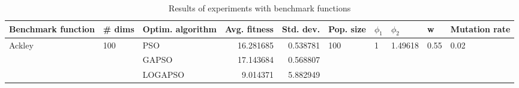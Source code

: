 \begin{table}
\centering
\caption{Results of experiments with benchmark functions}
\begin{tabular}{lllrrlllll}
\toprule
     Benchmark function &              \# dims & Optim. algorithm &  Avg. fitness &  Std. dev. &            Pop. size &         $\phi_{1}$ &               $\phi_{2}$ &                     w &         Mutation rate \\
\midrule
\multirow{3}{*}{Ackley} & \multirow{3}{*}{100} &              PSO &     16.281685 &   0.538781 & \multirow{3}{*}{100} & \multirow{3}{*}{1} & \multirow{3}{*}{1.49618} & \multirow{3}{*}{0.55} & \multirow{3}{*}{0.02} \\
                        &                      &            GAPSO &     17.143684 &   0.568807 &                      &                    &                          &                       &                       \\
                        &                      &          LOGAPSO &      9.014371 &   5.882949 &                      &                    &                          &                       &                       \\
\bottomrule
\end{tabular}
\end{table}

